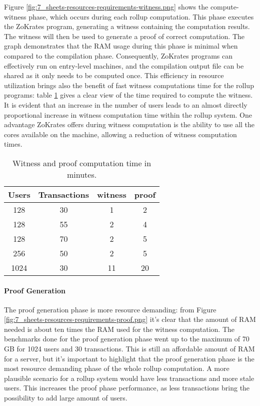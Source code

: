 Figure \ref{fig:7_sheets-resources-requirements-witness.png} shows the compute-witness phase, which occurs during each rollup computation. This phase executes the ZoKrates program, generating a witness containing the computation results. The witness will then be used to generate a proof of correct computation. The graph demonstrates that the RAM usage during this phase is minimal when compared to the compilation phase. Consequently, ZoKrates programs can effectively run on entry-level machines, and the compilation output file can be shared as it only needs to be computed once. This efficiency in resource utilization brings also the benefit of fast witness computations time for the rollup programs: table \ref{tab:6_witness-proof-time} gives a clear view of the time required to compute the witness. It is evident that an increase in the number of users leads to an almost directly proportional increase in witness computation time within the rollup system. One advantage ZoKrates offers during witness computation is the ability to use all the cores available on the machine, allowing a reduction of witness computation times.

\begin{table}
	\centering
	\begin{tabular}{|c|c|c|c|}
		\hline
		Users & Transactions & witness & proof \\ \hline
		128   & 30           & 1       & 2     \\ \hline
		128   & 55           & 2       & 4     \\ \hline
		128   & 70           & 2       & 5     \\ \hline
		256   & 50           & 2       & 5     \\ \hline
		1024  & 30           & 11      & 20    \\ \hline
	\end{tabular}
	\caption[Witness Proof time]{Witness and proof computation time in minutes.}
	\label{tab:6_witness-proof-time}
\end{table}

\paragraph{Proof Generation}

The proof generation phase is more resource demanding: from Figure \ref{fig:7_sheets-resources-requirements-proof.png} it's clear that the amount of RAM needed is about ten times the RAM used for the witness computation. The benchmarks done for the proof generation phase went up to the maximum of 70 GB for 1024 users and 30 transactions. This is still an affordable amount of RAM for a server, but it's important to highlight that the proof generation phase is the most resource demanding phase of the whole rollup computation. A more plausible scenario for a rollup system would have less transactions and more stale users. This increases the proof phase performance, as less transactions bring the possibility to add large amount of users.

